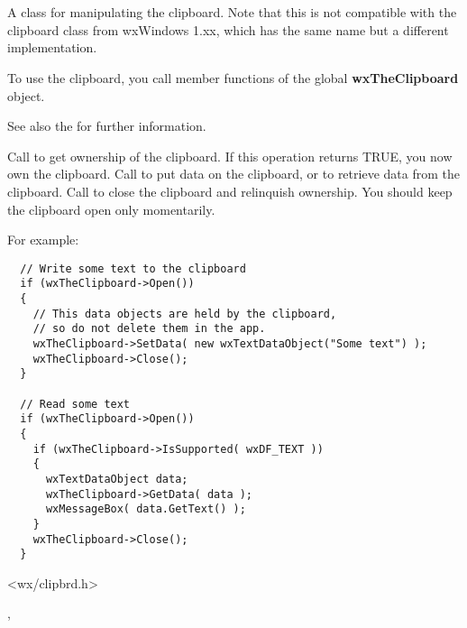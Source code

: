 \section{}\label{wxclipboard}

A class for manipulating the clipboard. Note that this is not compatible with the
clipboard class from wxWindows 1.xx, which has the same name but a different implementation.

To use the clipboard, you call member functions of the global {\bf wxTheClipboard} object.

See also the  for further information.

Call  to get ownership of the clipboard. If this operation returns TRUE, you
now own the clipboard. Call  to put data
on the clipboard, or  to
retrieve data from the clipboard. Call  to close
the clipboard and relinquish ownership. You should keep the clipboard open only momentarily.

For example:

\begin{verbatim}
  // Write some text to the clipboard
  if (wxTheClipboard->Open())
  {
    // This data objects are held by the clipboard, 
    // so do not delete them in the app.
    wxTheClipboard->SetData( new wxTextDataObject("Some text") );
    wxTheClipboard->Close();
  }

  // Read some text
  if (wxTheClipboard->Open())
  {
    if (wxTheClipboard->IsSupported( wxDF_TEXT ))
    {
      wxTextDataObject data;
      wxTheClipboard->GetData( data );
      wxMessageBox( data.GetText() );
    }  
    wxTheClipboard->Close();
  }
\end{verbatim}




<wx/clipbrd.h>


, 



